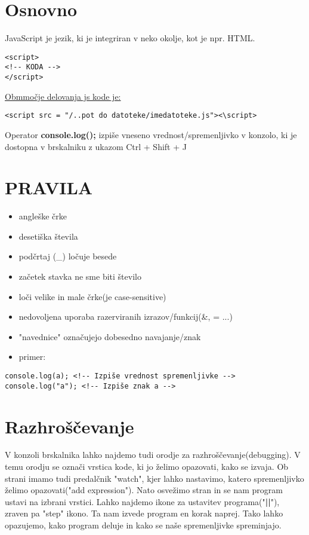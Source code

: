 \section{Osnovno}

JavaScript je jezik, ki je integriran v neko okolje, kot je npr. HTML.
\begin{verbatim}
<script>
<!-- KODA -->
</script>
\end{verbatim}

\underline{Obmmočje delovanja js kode je:} 
\begin{verbatim}
<script src = "/..pot do datoteke/imedatoteke.js"><\script>
\end{verbatim}

Operator \textbf{console.log();} izpiše vneseno vrednost/spremenljivko v konzolo, ki je dostopna v brskalniku z ukazom Ctrl + Shift + J

\newpage
\section{PRAVILA}
\begin{itemize}
	\item angleške črke
	\item desetiška števila
	\item podčrtaj (\_) ločuje besede
	\item začetek stavka ne sme biti število
	\item loči velike in male črke(je case-sensitive) 
	\item nedovoljena uporaba razerviranih izrazov/funkcij(\&, = ...)
	\item "navednice" označujejo dobesedno navajanje/znak
	\item primer:
\end{itemize}

\begin{verbatim}
console.log(a); <!-- Izpiše vrednost spremenljivke -->
console.log("a"); <!-- Izpiše znak a -->
\end{verbatim}

\section{Razhroščevanje}

V konzoli brskalnika lahko najdemo tudi orodje za razhroščevanje(debugging). V temu orodju se označi vrstica kode, ki jo želimo opazovati, kako se izvaja. Ob strani imamo tudi predalčnik "watch", kjer lahko nastavimo, katero spremenljivko želimo opazovati("add expression"). Nato osvežimo stran in se nam program ustavi na izbrani vrstici. Lahko najdemo ikone za ustavitev programa("\textbf{||}"), zraven pa "step" ikono. Ta nam izvede program en korak naprej. Tako lahko opazujemo, kako program deluje in kako se naše spremenljivke spreminjajo.
\newpage
